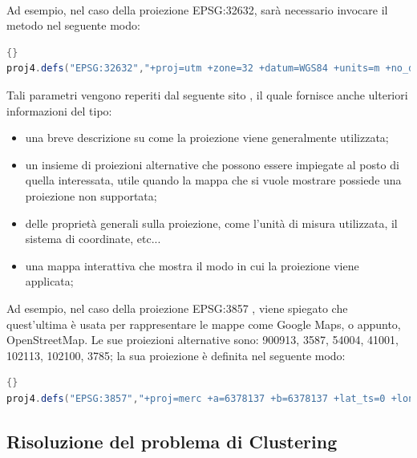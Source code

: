 \\Ad esempio, nel caso della proiezione EPSG:32632, sarà necessario invocare il metodo nel seguente modo:
\begin{lstlisting}[language=Java]{}
proj4.defs("EPSG:32632","+proj=utm +zone=32 +datum=WGS84 +units=m +no_defs +type=crs");
\end{lstlisting}
Tali parametri vengono reperiti dal seguente sito \cite{ProiezioneESPG3857}, il quale fornisce anche ulteriori informazioni del tipo:
\begin{itemize}
    \item una breve descrizione su come la proiezione viene generalmente utilizzata;
    \item un insieme di proiezioni alternative che possono essere impiegate al posto di quella interessata, utile quando la mappa che si vuole mostrare possiede una proiezione non supportata;
    \item delle proprietà generali sulla proiezione, come l'unità di misura utilizzata, il sistema di coordinate, etc...
    \item una mappa interattiva che mostra il modo in cui la proiezione viene applicata;
\end{itemize}
Ad esempio, nel caso della proiezione EPSG:3857 \cite{ProiezioneESPG3857}, viene spiegato che quest'ultima è usata per rappresentare le mappe come Google Maps, o appunto, OpenStreetMap. Le sue proiezioni alternative sono: 900913, 3587, 54004, 41001, 102113, 102100, 3785; la sua proiezione è definita nel seguente modo:
\begin{lstlisting}[language=Java]{}
proj4.defs("EPSG:3857","+proj=merc +a=6378137 +b=6378137 +lat_ts=0 +lon_0=0 +x_0=0 +y_0=0 +k=1 +units=m +nadgrids=@null +wktext +no_defs +type=crs");
\end{lstlisting}

%

\subsection{Risoluzione del problema di Clustering }


